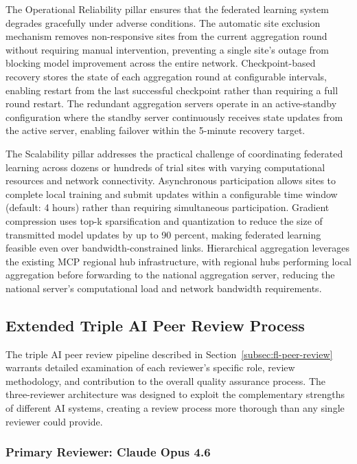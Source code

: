 The Operational Reliability pillar ensures that the federated learning system
degrades gracefully under adverse conditions. The automatic site exclusion
mechanism removes non-responsive sites from the current aggregation round
without requiring manual intervention, preventing a single site's outage from
blocking model improvement across the entire network. Checkpoint-based recovery
stores the state of each aggregation round at configurable intervals, enabling
restart from the last successful checkpoint rather than requiring a full round
restart. The redundant aggregation servers operate in an active-standby
configuration where the standby server continuously receives state updates from
the active server, enabling failover within the 5-minute recovery target.

The Scalability pillar addresses the practical challenge of coordinating
federated learning across dozens or hundreds of trial sites with varying
computational resources and network connectivity. Asynchronous participation
allows sites to complete local training and submit updates within a configurable
time window (default: 4 hours) rather than requiring simultaneous participation.
Gradient compression uses top-k sparsification and quantization to reduce the
size of transmitted model updates by up to 90 percent, making federated
learning feasible even over bandwidth-constrained links. Hierarchical
aggregation leverages the existing MCP regional hub infrastructure, with
regional hubs performing local aggregation before forwarding to the national
aggregation server, reducing the national server's computational load and
network bandwidth requirements.

\subsection{Extended Triple AI Peer Review Process}
\label{subsec:fl-peer-review-extended}

The triple AI peer review pipeline described in
Section~\ref{subsec:fl-peer-review} warrants detailed examination of each
reviewer's specific role, review methodology, and contribution to the overall
quality assurance process. The three-reviewer architecture was designed to
exploit the complementary strengths of different AI systems, creating a review
process more thorough than any single reviewer could provide.

\subsubsection{Primary Reviewer: Claude Opus 4.6}

